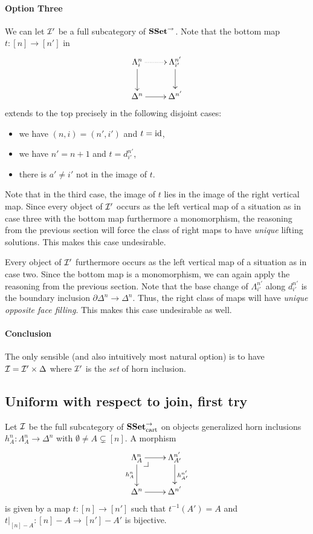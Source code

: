 \documentclass[reqno,10pt,a4paper,oneside]{amsart}
\begin{document}
\paragraph{Option Three}

We can let $\cal{I'}$ be a full subcategory of $\SSet^{\to}$.
Note that the bottom map $t : [n] \to [n']$ in
\[
\xymatrix{
  \Lambda_i^n
  \ar@{.>}[r]
  \ar[d]
&
  \Lambda_{i'}^{n'}
  \ar[d]
\\
  \Delta^n
  \ar[r]
&
  \Delta^{n'}
}
\]
extends to the top precisely in the following disjoint cases:
\begin{itemize}
\item
we have $(n, i) = (n', i')$ and $t = \id$,
\item
we have $n' = n + 1$ and $t = d_{i'}^{n'}$,
\item
there is $a' \neq i'$ not in the image of $t$.
\end{itemize}

Note that in the third case, the image of $t$ lies in the image of the right vertical map.
Since every object of $\cal{I'}$ occurs as the left vertical map of a situation as in case three with the bottom map furthermore a monomorphism, the reasoning from the previous section will force the class of right maps to have \emph{unique} lifting solutions.
This makes this case undesirable.

Every object of $\cal{I'}$ furthermore occurs as the left vertical map of a situation as in case two.
Since the bottom map is a monomorphism, we can again apply the reasoning from the previous section.
Note that the base change of $\Lambda_{i'}^{n'}$ along $d_{i'}^{n'}$ is the boundary inclusion $\partial \Delta^n \to \Delta^n$.
Thus, the right class of maps will have \emph{unique opposite face filling}.
This makes this case undesirable as well.

\paragraph{Conclusion}

The only sensible (and also intuitively most natural option) is to have $\cal{I} = \cal{I'} \times \Delta$ where $\cal{I'}$ is the \emph{set} of horn inclusion.

\subsection*{Uniform with respect to join, first try}

Let $\cal{I}$ be the full subcategory of $\SSet_{\text{cart}}^{\to}$ on objects generalized horn inclusions $h_A^n : \Lambda_A^n \to \Delta^n$ with $\emptyset \neq A \subsetneq [n]$.
A morphism
\[
\xymatrix{
  \Lambda_A^n
  \ar[r]
  \ar[d]_{h_A^n}
  \pullback{dr}
&
  \Lambda_{A'}^{n'}
  \ar[d]^{h_{A'}^{n'}}
\\
  \Delta^{n}
  \ar[r]
&
  \Delta^{n'}
}
\] 
is given by a map $t : [n] \to [n']$ such that $t^{-1}(A') = A$ and $t|_{[n] - A} : [n] - A \to [n'] - A'$ is bijective.
\end{document}
